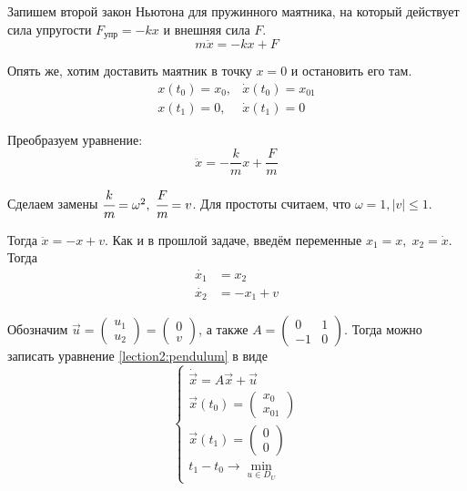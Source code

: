 Запишем второй закон Ньютона для пружинного маятника, на который действует сила упругости $F_{\text{упр}} = -kx$ и внешняя сила $F$.
\begin{equation}
    m\ddot{x} = -kx + F
\end{equation}

Опять же, хотим доставить маятник в точку $x = 0$ и остановить его там.
\begin{equation}
    \begin{array}{cc}
        x(t_0) = x_0, & \dot{x}(t_0) = x_{01} \\
        x(t_1) = 0, & \dot{x}(t_1) = 0
    \end{array}
\end{equation}

Преобразуем уравнение:
\begin{equation}
    \ddot{x} = -\frac{k}{m}x + \frac{F}{m}
\end{equation}

Сделаем замены $\cfrac{k}{m} = \omega^2, \; \cfrac{F}{m} = v$.
Для простоты считаем, что $\omega = 1, |v| \leqslant 1$.

Тогда $\ddot{x} = -x + v$.
Как и в прошлой задаче, введём переменные ${x_1 = x}, \; {x_2 = \dot{x}}$.
Тогда 
\begin{align}
    \label{lection2:pendulum}
    \dot{x_1} & = x_2 \\
    \dot{x_2} & = -x_1 + v
\end{align}

Обозначим ${\vec{u} = \left( \begin{matrix} u_1 \\ u_2 \end{matrix} \right)} = \left( \begin{matrix} 0 \\ v \end{matrix} \right) $,
а также $A = \left(
    \begin{matrix}
        0 & 1 \\
        -1 & 0
    \end{matrix}
\right)$.
Тогда можно записать уравнение \ref{lection2:pendulum} в виде
\begin{equation}
    \begin{cases}
        \dot{\vec{x}} = A\vec{x} + \vec{u} \\
        \vec{x}(t_0) = \left(
            \begin{matrix}
                x_0 \\
                x_{01}
            \end{matrix}
        \right) \\
        \vec{x}(t_1) = \left(
            \begin{matrix}
                0 \\
                0
            \end{matrix}
        \right) \\
        t_1 - t_0 \rightarrow \min\limits_{u \in D_U}
    \end{cases}
\end{equation}

